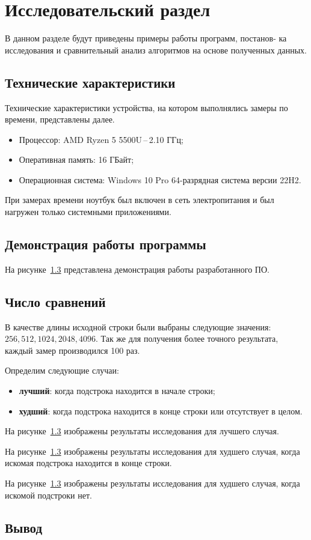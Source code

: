 \chapter{Исследовательский раздел}
В данном разделе будут приведены примеры работы программ, постанов-
ка исследования и сравнительный анализ алгоритмов на основе полученных
данных.

\section{Технические характеристики}
Технические характеристики устройства, на котором выполнялись замеры по времени, представлены далее.
\begin{itemize}
	\item Процессор: AMD Ryzen 5 5500U\,--\,2.10 ГГц;
	\item Оперативная память: 16 ГБайт;
	\item Операционная система: Windows 10 Pro 64-разрядная система версии 22H2.
\end{itemize}

При замерах времени ноутбук был включен в сеть электропитания и был нагружен только системными приложениями.

\section{Демонстрация работы программы}
На рисунке~\ref{} представлена демонстрация работы разработанного ПО.  

\section{Число сравнений}
В качестве длины исходной строки были выбраны следующие значения: $256, 512, 1024, 2048, 4096$. Так же для получения более точного результата, каждый замер производился 100 раз.

Определим следующие случаи:
\begin{itemize}
	\item \textbf{лучший}: когда подстрока находится в начале строки;
	\item \textbf{худший}: когда подстрока находится в конце строки или отсутствует в целом.
\end{itemize}

На рисунке~\ref{} изображены результаты исследования для лучшего случая.

На рисунке~\ref{} изображены результаты исследования для худшего случая, когда искомая подстрока находится в конце строки.

На рисунке~\ref{} изображены результаты исследования для худшего случая, когда искомой подстроки нет.

\section*{Вывод}